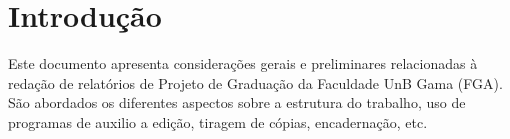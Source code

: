 \chapter[Introdução]{Introdução}

Este documento apresenta considerações gerais e preliminares relacionadas 
à redação de relatórios de Projeto de Graduação da Faculdade UnB Gama 
(FGA). São abordados os diferentes aspectos sobre a estrutura do trabalho, 
uso de programas de auxilio a edição, tiragem de cópias, encadernação, etc.

